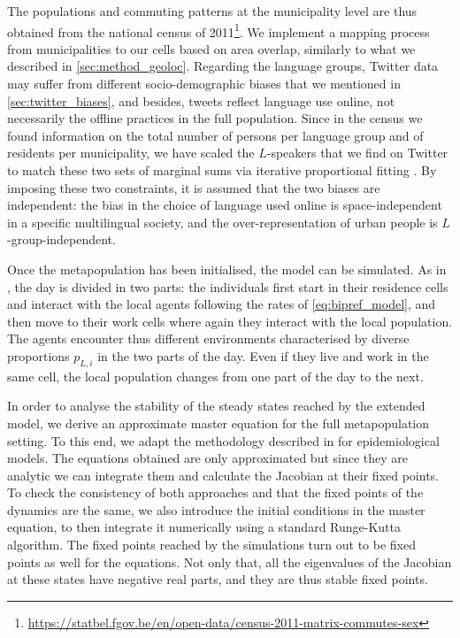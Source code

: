 \documentclass[../thesis.tex]{subfiles}
\begin{document}
The populations and commuting patterns at the municipality level are thus obtained from
the national census of
2011\footnote{\url{https://statbel.fgov.be/en/open-data/census-2011-matrix-commutes-sex}}.
We implement a mapping process from municipalities to our cells based on area overlap,
similarly to what we described in \cref{sec:method_geoloc}. Regarding the language
groups, Twitter data may suffer from different socio-demographic biases that we
mentioned in \cref{sec:twitter_biases}, and besides, tweets reflect language use online,
not necessarily the offline practices in the full population. Since in the census we
found information on the total number of persons per language group and of residents per
municipality, we have scaled the $L$-speakers that we find on Twitter to match these two
sets of marginal sums via iterative proportional fitting
\cite{DemingLeastSquares1940,FienbergIterativeProcedure1970}. By imposing these two
constraints, it is assumed that the two biases are independent: the bias in the choice
of language used online is space-independent in a specific multilingual society, and the
over-representation of urban people is $L$-group-independent.

Once the metapopulation has been initialised, the model can be simulated. As in
\cite{Fernandez-GraciaVoterModel2014}, the day is divided in two parts: the individuals
first start in their residence cells and interact with the local agents following the
rates of \cref{eq:bipref_model}, and then move to their work cells where again they
interact with the local population. The agents encounter thus different environments
characterised by diverse proportions $p_{L,i}$ in the two parts of the day. Even if they
live and work in the same cell, the local population changes from one part of the day to
the next.

In order to analyse the stability of the steady states reached by the extended model, we
derive an approximate master equation for the full metapopulation setting. To this end,
we adapt the methodology described in
\cite{SattenspielStructuredEpidemic1995,BalcanModelingSpatial2010} for epidemiological
models. The equations obtained are only
approximated but since they are analytic we can integrate them and calculate the
Jacobian at their fixed points. To check the consistency of both approaches and that the
fixed points of the dynamics are the same, we also introduce the initial conditions in
the master equation, to then integrate it numerically using a standard Runge-Kutta
algorithm. The fixed points reached by the simulations turn out to be fixed points as
well for the equations. Not only that, all the eigenvalues of the Jacobian at these
states have negative real parts, and they are thus stable fixed points.
\end{document}
